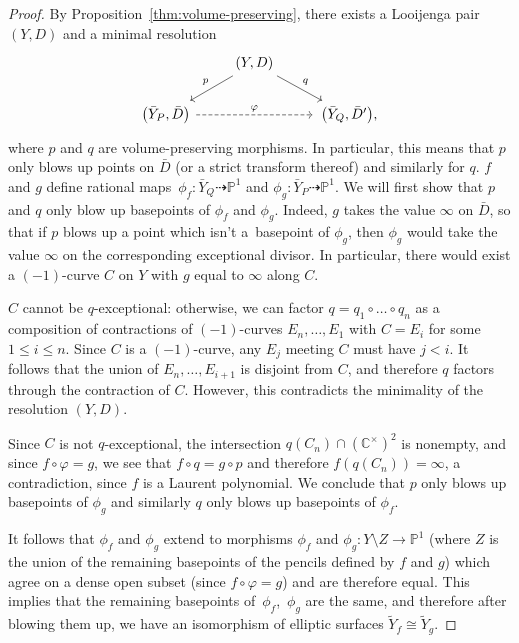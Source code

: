 \documentclass[pdftex]{sigma}
\numberwithin{equation}{section}
\newcommand{\CC}{\mathbb{C}}
\newcommand{\PP}{\mathbb{P}}
\begin{document}
\begin{proof}
By Proposition~\ref{thm:volume-preserving}, there exists a Looijenga pair $(Y, D)$ and a minimal resolution
	\[
	\begin{tikzcd}
		& (Y, D) \ar[dr, "q"] \ar[dl, swap, "p"]&\\
		\bigl(\bar{Y}_P, \bar{D}\bigr) \ar[rr, dashed, "\varphi"] &&\,\bigl(\bar{Y}_Q, \bar{D}'\bigr),
	\end{tikzcd}
	\]
	where $p$ and $q$ are volume-preserving morphisms. In particular, this means that $p$ only blows up points on $\bar{D}$ (or a strict transform thereof) and similarly for $q$. $f$ and $g$ define rational maps~${\phi_f \colon \bar{Y}_Q \dashrightarrow \PP^1}$ and $\phi_g \colon \bar{Y}_P \dashrightarrow \PP^1$. We will first show that $p$ and $q$ only blow up basepoints of $\phi_f$ and $\phi_g$. Indeed, $g$ takes the value $\infty$ on $\bar{D}$, so that if $p$ blows up a point which isn't a~basepoint of $\phi_g$, then $\phi_g$ would take the value $\infty$ on the corresponding exceptional divisor.
	In particular, there would exist a $(-1)$-curve $C$ on $Y$ with $g$ equal to $\infty$ along $C$.

	$C$ cannot be $q$-exceptional: otherwise, we can factor $q=q_1 \circ \dots \circ q_n$ as a composition of contractions of $(-1)$-curves $E_n, \dots, E_1$ with $C=E_i$ for some $1 \leq i \leq n$. Since $C$ is a $(-1)$-curve, any $E_j$ meeting $C$ must have $j<i$. It follows that the union of $E_n, \dots, E_{i+1}$ is disjoint from $C$, and therefore $q$ factors through the contraction of $C$. However, this contradicts the minimality of the resolution $(Y, D)$.

	Since $C$ is not $q$-exceptional, the intersection $q(C_n) \cap (\CC^\times)^2$ is nonempty, and since $f \circ \varphi=g$, we see that $f \circ q=g \circ p$ and therefore $f(q(C_n))=\infty$, a contradiction, since $f$ is a Laurent polynomial. We conclude that $p$ only blows up basepoints of $\phi_g$ and similarly $q$ only blows up basepoints of $\phi_f$.

	It follows that $\phi_f$ and $\phi_g$ extend to morphisms $\phi_f$ and $\phi_g \colon Y \setminus Z \rightarrow \PP^1$ (where $Z$ is the union of the remaining basepoints of the pencils defined by $f$ and $g$) which agree on a dense open subset (since $f \circ \varphi=g$) and are therefore equal. This implies that the remaining basepoints of~$\phi_f$,~$\phi_g$ are the same, and therefore after blowing them up, we have an isomorphism of elliptic surfaces $\tilde{Y}_f \cong \tilde{Y}_g$.


\end{proof}
\end{document}
